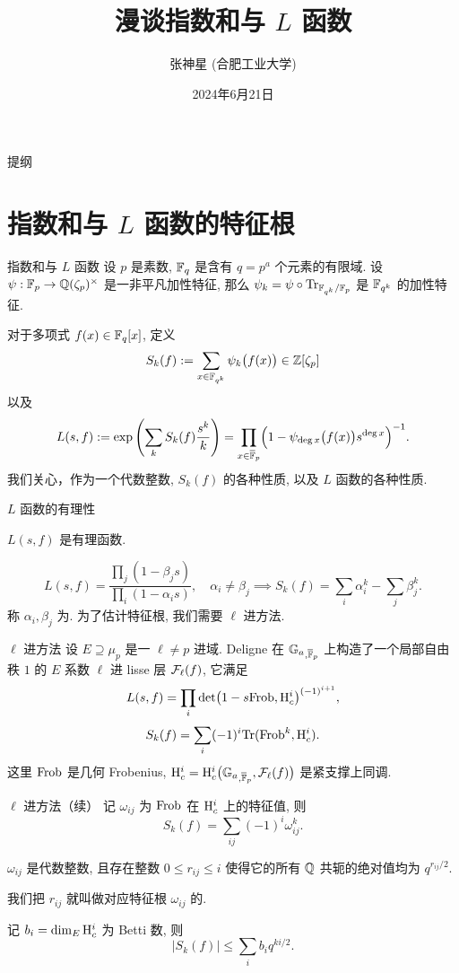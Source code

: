 \documentclass[aspectratio=169,handout]{ctexbeamer}
\title{漫谈指数和与 $L$ 函数}
\author{张神星 (合肥工业大学)}
\institute{首都师范大学}
\date{2024年6月21日}
\renewcommand\emph[1]{{\color{structure.fg!50!blue}{#1}}}
\begin{document}
{
	\setnaviboxempty
	\begin{frame}{提纲}
		\tableofcontents
	\end{frame}
}

\section{指数和与 $L$ 函数的特征根}
\begin{frame}{指数和与 $L$ 函数}
设 $p$ 是素数, ${\mathbb{F}}_q$ 是含有 $q=p^a$ 个元素的有限域.
设 $\psi:{\mathbb{F}}_p\to {\mathbb{Q}}(\zeta_p)^\times$ 是一非平凡加性特征,
那么 $\psi_k=\psi\circ {\mathrm{Tr}}_{{\mathbb{F}}_{q^k}/{\mathbb{F}}_p}$ 是 ${\mathbb{F}}_{q^k}$ 的加性特征.

对于多项式 $f(x)\in {\mathbb{F}}_q[x]$, 定义\emph{指数和}
\[S_k(f):=\sum_{x\in{\mathbb{F}}_{q^k}}\psi_k\bigl(f(x)\bigr)\in{\mathbb{Z}}[\zeta_p]\]
以及\emph{$L$ 函数}
\[L(s,f):=\exp\left(\sum_k S_k(f)\frac{s^k}{k}\right)=\prod_{x\in\overline{{\mathbb{F}}}_p}\Bigl(1-\psi_{\deg x}\bigl(f(x)\bigr)s^{\deg x}\Bigr)^{-1}.\]
我们关心，作为一个代数整数, $S_k(f)$ 的各种性质, 以及 $L$ 函数的各种性质.
\end{frame}


\begin{frame}{$L$ 函数的有理性}
\begin{theorem}
$L(s,f)$ 是有理函数.
\end{theorem} 
	\[L(s,f)=\frac{\prod_j (1-\beta_j s)}{\prod_i(1-\alpha_i s)},\quad \alpha_i\neq \beta_j
	\implies
	S_k(f)=\sum_i \alpha_i^k-\sum_j\beta_j^k.\]
称 $\alpha_i,\beta_j$ 为\emph{特征根}. 为了估计特征根, 我们需要 $\ell$ 进方法.

\end{frame}


\begin{frame}{$\ell$ 进方法}
设 $E\supseteq \mu_p$ 是一 $\ell\neq p$ 进域.
Deligne 在 ${\mathbb{G}_a}_{,\overline{{\mathbb{F}}}_p}$ 上构造了一个局部自由秩 $1$ 的 $E$ 系数 $\ell$ 进 lisse 层 ${\mathcal{F}}_\ell(f)$, 它满足
	\[L(s,f)=\prod_i \det\bigl(1-s {\mathrm{Frob}},{\mathrm{H}}^i_c\bigr)^{(-1)^{i+1}},\]
	\[S_k(f)=\sum_i (-1)^i{\mathrm{Tr}}({\mathrm{Frob}}^k,{\mathrm{H}}_c^i).\]
这里 ${\mathrm{Frob}}$ 是几何 Frobenius, ${\mathrm{H}}_c^i={\mathrm{H}}_c^i\bigl({\mathbb{G}_a}_{,\overline{{\mathbb{F}}}_p},{\mathcal{F}}_\ell(f)\bigr)$ 是紧支撑上同调.
\end{frame}


\begin{frame}{$\ell$ 进方法（续）}
记 $\omega_{ij}$ 为 ${\mathrm{Frob}}$ 在 ${\mathrm{H}}^i_c$ 上的特征值, 则
	\[S_k(f)=\sum_{ij}(-1)^i \omega_{ij}^k.\]

\begin{theorem}[Deligne]
$\omega_{ij}$ 是代数整数, 且存在整数 $0\le r_{ij}\le i$ 使得它的所有 ${\mathbb{Q}}$ 共轭的绝对值均为 $q^{r_{ij}/2}$.
\end{theorem}
我们把 $r_{ij}$ 就叫做对应特征根 $\omega_{ij}$ 的\emph{权}.

记 $b_i=\dim_{E}{\mathrm{H}}^i_c$ 为 Betti 数, 
则
	\[|S_k(f)|\le \sum_i b_i q^{ki/2}.\]
\end{frame}
\end{document}
